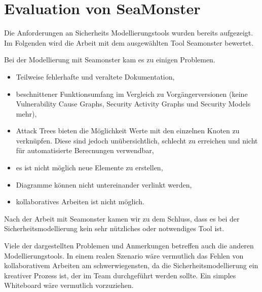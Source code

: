 \section{Evaluation von SeaMonster}
Die Anforderungen an Sicherheits Modellierungstools wurden bereits aufgezeigt. Im Folgenden wird die Arbeit mit dem ausgewählten Tool Seamonster bewertet.

Bei der Modellierung mit Seamonster kam es zu einigen Problemen.
\begin{itemize}
\item Teilweise fehlerhafte und veraltete Dokumentation,
\item beschnittener Funktionsumfang im Vergleich zu Vorgängerversionen (keine Vulnerability Cause Graphs, Security Activity Graphs und Security Models mehr),
\item Attack Trees bieten die Möglichkeit Werte mit den einzelnen Knoten zu verknüpfen. Diese sind jedoch unübersichtlich, schlecht zu erreichen und nicht für automatisierte Berecnungen verwendbar,
\item es ist nicht möglich neue Elemente zu erstellen,
\item Diagramme können nicht untereinander verlinkt werden,
\item kollaboratives Arbeiten ist nicht möglich.
\end{itemize}

Nach der Arbeit mit Seamonster kamen wir zu dem Schluss, dass es bei der Sicherheitsmodellierung kein sehr nützliches oder notwendiges Tool ist.

Viele der dargestellten Problemen und Anmerkungen betreffen auch die anderen Modellierungstools. In einem realen Szenario wäre vermutlich das Fehlen von kollaborativem Arbeiten am schwerwiegensten, da die Sicherheitsmodellierung ein kreativer Prozess ist, der im Team durchgeführt werden sollte. Ein simples Whiteboard wäre vermutlich vorzuziehen.